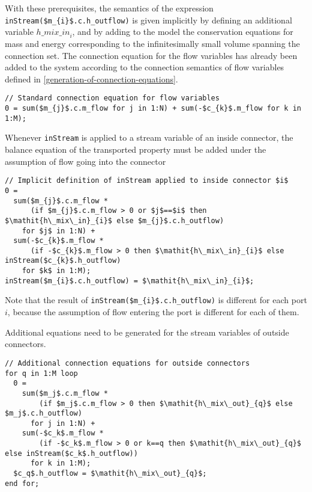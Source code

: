 With these prerequisites, the semantics of the expression
\lstinline!inStream($m_{i}$.c.h_outflow)! is given implicitly by
defining an additional variable $\mathit{h\_mix\_in}_{i}$, and by
adding to the model the conservation equations for mass and energy
corresponding to the infinitesimally small volume spanning the
connection set. The connection equation for the flow variables has
already been added to the system according to the connection semantics
of flow variables defined in \cref{generation-of-connection-equations}.

\begin{lstlisting}[language=modelica]
// Standard connection equation for flow variables
0 = sum($m_{j}$.c.m_flow for j in 1:N) + sum(-$c_{k}$.m_flow for k in 1:M);
\end{lstlisting}

Whenever \lstinline!inStream! is applied to a stream variable of an inside connector, the balance equation of the transported
property must be added under the assumption of flow going into the connector

\begin{lstlisting}[language=modelica]
// Implicit definition of inStream applied to inside connector $i$
0 =
  sum($m_{j}$.c.m_flow *
      (if $m_{j}$.c.m_flow > 0 or $j$==$i$ then $\mathit{h\_mix\_in}_{i}$ else $m_{j}$.c.h_outflow)
    for $j$ in 1:N) +
  sum(-$c_{k}$.m_flow *
      (if -$c_{k}$.m_flow > 0 then $\mathit{h\_mix\_in}_{i}$ else inStream($c_{k}$.h_outflow)
    for $k$ in 1:M);
inStream($m_{i}$.c.h_outflow) = $\mathit{h\_mix\_in}_{i}$;
\end{lstlisting}

Note that the result of
\lstinline!inStream($m_{i}$.c.h_outflow)! is different
for each port $i$, because the assumption of flow entering the port is
different for each of them.

Additional equations need to be generated for the stream variables of
outside connectors.

\begin{lstlisting}[language=modelica]
// Additional connection equations for outside connectors
for q in 1:M loop
  0 =
    sum($m_j$.c.m_flow *
        (if $m_j$.c.m_flow > 0 then $\mathit{h\_mix\_out}_{q}$ else $m_j$.c.h_outflow)
      for j in 1:N) +
    sum(-$c_k$.m_flow *
        (if -$c_k$.m_flow > 0 or k==q then $\mathit{h\_mix\_out}_{q}$ else inStream($c_k$.h_outflow))
      for k in 1:M);
  $c_q$.h_outflow = $\mathit{h\_mix\_out}_{q}$;
end for;
\end{lstlisting}

